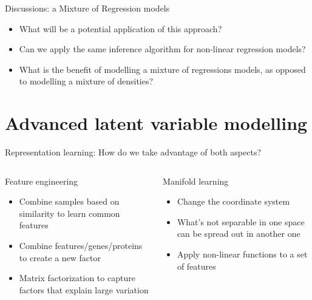 \documentclass[
  ignorenonframetext,
  aspectratio=169]{beamer}
\begin{document}
\begin{frame}{Discussions: a Mixture of Regression models}
\protect\hypertarget{discussions-a-mixture-of-regression-models}{}
\begin{itemize}
\item
  What will be a potential application of this approach?
\item
  Can we apply the same inference algorithm for non-linear regression
  models?
\item
  What is the benefit of modelling a mixture of regressions models, as
  opposed to modelling a mixture of densities?
\end{itemize}
\end{frame}

\hypertarget{advanced-latent-variable-modelling}{%
\section{Advanced latent variable
modelling}\label{advanced-latent-variable-modelling}}

\begin{frame}{Representation learning: How do we take advantage of both
aspects?}
\protect\hypertarget{representation-learning-how-do-we-take-advantage-of-both-aspects}{}
\begin{columns}[T]
\begin{column}{.45\textwidth}
\begin{block}{Feature engineering}
\protect\hypertarget{feature-engineering-3}{}
\begin{itemize}
\item
  Combine samples based on similarity to learn common features
\item
  Combine features/genes/proteins to create a new factor
\item
  Matrix factorization to capture factors that explain large variation
\end{itemize}
\end{block}
\end{column}

\begin{column}{.45\textwidth}
\begin{block}{Manifold learning}
\protect\hypertarget{manifold-learning-2}{}
\begin{itemize}
\item
  Change the coordinate system
\item
  What's not separable in one space can be spread out in another one
\item
  Apply non-linear functions to a set of features
\end{itemize}
\end{block}
\end{column}
\end{columns}
\end{frame}
\end{document}
